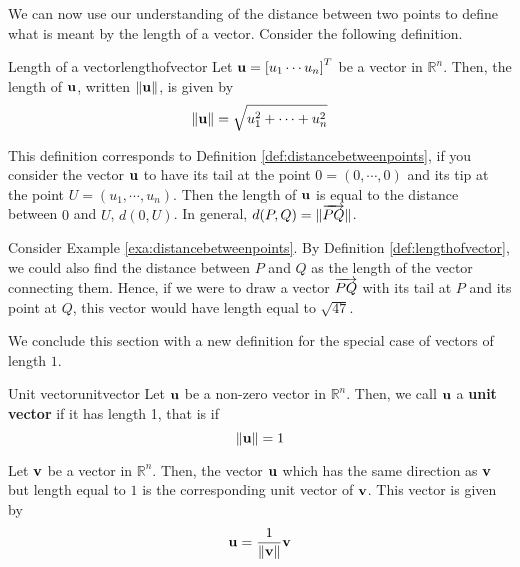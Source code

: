 We can now use our understanding of the distance between two points to define what is meant by the length of a 
vector. Consider the following definition.  

\begin{definition}{Length of a vector}{lengthofvector}
Let ${\bf u} = \left[ u_{1} \cdots u_{n} \right]^T$ be a vector in
$\mathbb{R}^n$. Then, the length of ${\bf u}$, written $\| {\bf u} \|$, is given by
\begin{equation*}
\|
{\bf u}
\|
= \sqrt{ u_{1}^2 + \cdots + u_{n}^2}
\end{equation*}
\end{definition}

This definition corresponds to Definition
\ref{def:distancebetweenpoints}, if you consider the vector ${\bf u}$
to have its tail at the point $0 = \left( 0, \cdots ,0 \right)$ and its
tip at the point $U = \left(u_1, \cdots, u_n \right)$.  Then the length of
${\bf u}$ is equal to the distance between $0$ and $U$, $d(0,U)$. In general, $d(P,Q) = \| \overrightarrow{PQ} \|$. 

Consider Example \ref{exa:distancebetweenpoints}. By Definition \ref{def:lengthofvector}, we could also find the distance between $P$ and $Q$ 
as the length of the vector connecting them. Hence, if we were to draw a vector $\overrightarrow{PQ}$ 
with its tail at $P$ and its point at $Q$, this vector would have length equal to 
$\sqrt{47}$.

We conclude this section with a new definition for the special case of
vectors of length $1$.

\begin{definition}{Unit vector}{unitvector}
Let ${\bf u}$ be a non-zero vector in $\mathbb{R}^{n}$. Then, we call ${\bf u}$ a 
\textbf{unit vector} if it has length 1, that is if
\begin{equation*}
\| {\bf u} \|
=
1
\end{equation*}
\end{definition}

Let ${\bf v}$ be a vector in $\mathbb{R}^{n}$. Then, the vector ${\bf u}$
which has the same direction as ${\bf v}$ but length equal to $1$ is the corresponding unit vector of ${\bf v}$. 
This vector is given by
\begin{equation*}
{\bf u}
=
\frac{1}{\| {\bf v} \|}
{\bf v}
\end{equation*}

